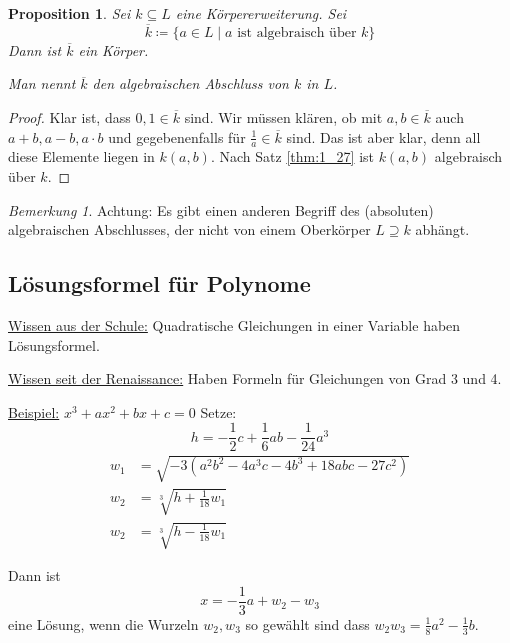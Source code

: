 \documentclass[a4paper,12pt,numbers=noenddot,parskip=full]{scrartcl}
\newcommand{\heading}{\underline}
\theoremstyle{dotless}
\newtheorem{proposition}[theorem]{Proposition}
\theoremstyle{remark}
\newtheorem*{remark}{Bemerkung}
\begin{document}
	\begin{proposition}
		Sei $k \subseteq L$ eine Körpererweiterung. Sei
		\begin{equation*}
			\overline{k} \coloneqq \{ a \in L \mid a \text{ ist algebraisch über } k \}
		\end{equation*}
		Dann ist $\overline{k}$ ein Körper.
		
		Man nennt $\overline{k}$ den algebraischen Abschluss von $k$ in $L$.
	\end{proposition}

	\begin{proof}
		Klar ist, dass $0,1 \in \overline{k}$ sind. Wir müssen klären, ob mit $a,b \in \overline{k}$ auch $a+b, a-b, a \cdot b$ und gegebenenfalls für $\frac{1}{a} \in \overline{k}$ sind. Das ist aber klar, denn all diese Elemente liegen in $k(a,b)$. Nach Satz \ref{thm:1_27} ist $k(a,b)$ algebraisch über $k$.
	\end{proof}

	\begin{remark}
		Achtung: Es gibt einen anderen Begriff des (absoluten) algebraischen Abschlusses, der nicht von einem Oberkörper $L \supseteq k$ abhängt.
	\end{remark}

	\subsection{Lösungsformel für Polynome}
	
	\heading{Wissen aus der Schule:} Quadratische Gleichungen in einer Variable haben Lösungsformel.
	
	\heading{Wissen seit der Renaissance:} Haben Formeln für Gleichungen von Grad 3 und 4.
	
	\heading{Beispiel:} $x^3 + a x^2 + bx + c = 0$ Setze:
	\begin{equation*}
		h = - \frac12 c + \frac16 a b - \frac{1}{24} a^3
	\end{equation*}
	\begin{align*}
		w_1 &= \sqrt{-3 (a^2 b^2 - 4 a^3c - 4b^3 + 18abc - 27c^2)} \\
		w_2 &= \sqrt[3]{h + \frac{1}{18} w_1} \\
		w_2 &= \sqrt[3]{h - \frac{1}{18} w_1}
	\end{align*}
	
	Dann ist
	\begin{equation*}
		x = - \frac13 a + w_2 - w_3
	\end{equation*}
	eine Lösung, wenn die Wurzeln $w_2, w_3$ so gewählt sind dass $w_2 w_3 = \frac18 a^2 - \frac13 b$.
	
\end{document}
